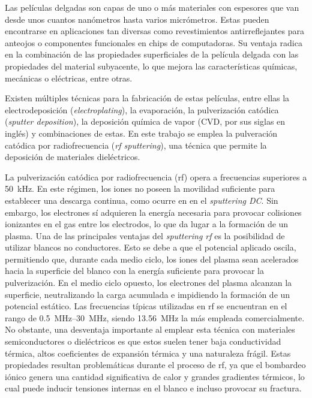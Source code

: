 \documentclass[12pt]{IEEEtran}
\begin{document}
Las películas delgadas son capas de uno o más materiales con espesores que van desde unos cuantos nanómetros hasta varios micrómetros. Estas pueden encontrarse en aplicaciones tan diversas como revestimientos antirreflejantes para anteojos o componentes funcionales en chips de computadoras. Su ventaja radica en la combinación de las propiedades superficiales de la película delgada con las propiedades del material subyacente, lo que mejora las características químicas, mecánicas o eléctricas, entre otras.

Existen múltiples técnicas para la fabricación de estas películas, entre ellas la electrodeposición (\emph{electroplating}), la evaporación, la pulverización catódica (\emph{sputter deposition}), la deposición química de vapor  (CVD, por sus siglas en inglés) y combinaciones de estas. En este trabajo se emplea la pulveración catódica por radiofrecuencia (\emph{rf sputtering}), una técnica que permite la deposición de materiales dieléctricos.

La pulverización catódica por radiofrecuencia (rf) opera a frecuencias superiores a \qty{50}{\kHz}. En este régimen, los iones no poseen la movilidad suficiente para establecer una descarga continua, como ocurre en en el \emph{sputtering DC}. Sin embargo, los electrones sí adquieren la energía necesaria para provocar colisiones ionizantes en el gas entre los electrodos, lo que da lugar a la formación de un plasma.
Una de las principales ventajas del \emph{sputtering rf} es la posibilidad de utilizar blancos no conductores. Esto se debe a que el potencial aplicado oscila, permitiendo que, durante cada medio ciclo, los iones del plasma sean acelerados hacia la superficie del blanco con la energía suficiente para provocar la pulverización. En el medio ciclo opuesto, los electrones del plasma alcanzan la superficie, neutralizando la carga acumulada e impidiendo la formación de un potencial estático.
Las frecuencias típicas utilizadas en rf se encuentran en el rango de \qtyrange[range-units=single]{0.5}{30}{\MHz}, siendo \qty{13.56}{\MHz} la más empleada comercialmente.\cite{antaritagutierrezSintesisPeliculasDelgadas2017,mattoxChapter7Physical2010}
No obstante, una desventaja importante al emplear esta técnica con materiales semiconductores o dieléctricos es que estos suelen tener baja conductividad térmica, altos coeficientes de expansión térmica y una naturaleza frágil. Estas propiedades resultan problemáticas durante el proceso de rf, ya que el bombardeo iónico genera una cantidad significativa de calor y grandes gradientes térmicos, lo cual puede inducir tensiones internas en el blanco e incluso provocar su fractura.
\end{document}
